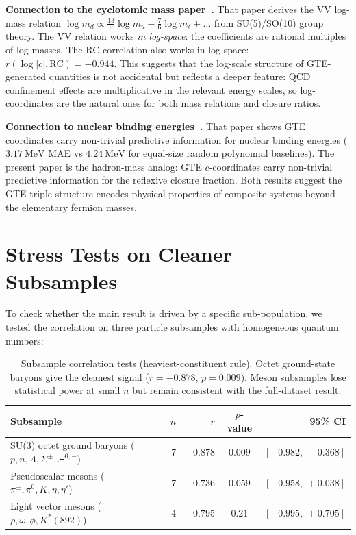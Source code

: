 \documentclass[12pt,a4paper]{article}
\newcommand{\RC}{\ensuremath{\mathrm{RC}}}
\begin{document}
\textbf{Connection to the cyclotomic mass paper~\cite{Spivack2026_CyclotomicMass}.}
That paper derives the VV log-mass relation $\log m_d \propto \tfrac{13}{9}\log m_u - \tfrac{7}{6}\log m_\ell + \ldots$ from SU(5)/SO(10) group theory.
The VV relation works \emph{in log-space}: the coefficients are rational
multiples of log-masses.
The RC correlation also works in log-space: $r(\log|c|, \RC) = -0.944$.
This suggests that the log-scale structure of GTE-generated quantities
is not accidental but reflects a deeper feature: QCD confinement effects
are multiplicative in the relevant energy scales, so log-coordinates are
the natural ones for both mass relations and closure ratios.

\textbf{Connection to nuclear binding energies~\cite{spivack2025nuclear_physics}.}
That paper shows GTE coordinates carry non-trivial predictive information
for nuclear binding energies ($\SI{3.17}{\mega\eV}$ MAE vs $\SI{4.24}{\mega\eV}$
for equal-size random polynomial baselines).
The present paper is the hadron-mass analog: GTE $c$-coordinates carry
non-trivial predictive information for the reflexive closure fraction.
Both results suggest the GTE triple structure encodes physical properties
of composite systems beyond the elementary fermion masses.

\section{Stress Tests on Cleaner Subsamples}
\label{sec:subsamples}

To check whether the main result is driven by a specific sub-population,
we tested the correlation on three particle subsamples with homogeneous
quantum numbers:

\begin{table}[H]
\centering
\caption{Subsample correlation tests (heaviest-constituent rule).
  Octet ground-state baryons give the cleanest signal ($r=-0.878$, $p=0.009$).
  Meson subsamples lose statistical power at small $n$ but remain consistent
  with the full-dataset result.}
\label{tab:subsamples}
\small
\begin{tabular}{lrrcr}
\toprule
Subsample & $n$ & $r$ & $p$-value & 95\% CI \\
\midrule
SU(3) octet ground baryons
  ($p,n,\Lambda,\Sigma^\pm,\Xi^{0,-}$)        & 7 & $-0.878$ & $0.009$ & $[-0.982,\,-0.368]$ \\
Pseudoscalar mesons
  ($\pi^\pm,\pi^0,K,\eta,\eta'$)              & 7 & $-0.736$ & $0.059$ & $[-0.958,\,+0.038]$ \\
Light vector mesons
  ($\rho,\omega,\phi,K^*(892)$)               & 4 & $-0.795$ & $0.21$  & $[-0.995,\,+0.705]$ \\
\bottomrule
\end{tabular}
\end{table}
\end{document}
